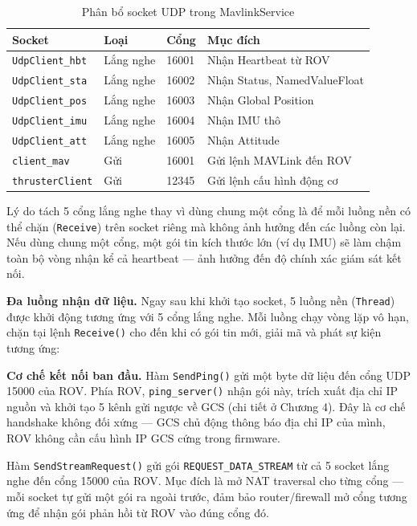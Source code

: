 \documentclass[../DoAn.tex]{subfiles}
\begin{document}
\begin{table}[H]
\centering
\renewcommand{\arraystretch}{1.3}
\begin{tabular}{|l|l|l|p{5cm}|}
\hline
\textbf{Socket} & \textbf{Loại} & \textbf{Cổng} & \textbf{Mục đích} \\
\hline
\texttt{UdpClient\_hbt} & Lắng nghe & 16001 & Nhận Heartbeat từ ROV \\
\hline
\texttt{UdpClient\_sta} & Lắng nghe & 16002 & Nhận Status, NamedValueFloat \\
\hline
\texttt{UdpClient\_pos} & Lắng nghe & 16003 & Nhận Global Position \\
\hline
\texttt{UdpClient\_imu} & Lắng nghe & 16004 & Nhận IMU thô \\
\hline
\texttt{UdpClient\_att} & Lắng nghe & 16005 & Nhận Attitude \\
\hline
\texttt{client\_mav}    & Gửi       & 16001 & Gửi lệnh MAVLink đến ROV \\
\hline
\texttt{thrusterClient} & Gửi       & 12345 & Gửi lệnh cấu hình động cơ \\
\hline
\end{tabular}
\caption{Phân bổ socket UDP trong MavlinkService}
\label{tab:mavlink_sockets}
\end{table}

Lý do tách 5 cổng lắng nghe thay vì dùng chung một cổng là để mỗi
luồng nền có thể chặn (\texttt{Receive}) trên socket riêng mà không
ảnh hưởng đến các luồng còn lại. Nếu dùng chung một cổng, một gói
tin kích thước lớn (ví dụ IMU) sẽ làm chậm toàn bộ vòng nhận kể cả
heartbeat --- ảnh hưởng đến độ chính xác giám sát kết nối.

\textbf{Đa luồng nhận dữ liệu.}
Ngay sau khi khởi tạo socket, 5 luồng nền (\texttt{Thread}) được khởi
động tương ứng với 5 cổng lắng nghe. Mỗi luồng chạy vòng lặp vô hạn,
chặn tại lệnh \texttt{Receive()} cho đến khi có gói tin mới, giải mã
và phát sự kiện tương ứng:


\textbf{Cơ chế kết nối ban đầu.}
Hàm \texttt{SendPing()} gửi một byte dữ liệu đến cổng UDP 15000 của
ROV. Phía ROV, \texttt{ping\_server()} nhận gói này, trích xuất địa
chỉ IP nguồn và khởi tạo 5 kênh gửi ngược về GCS (chi tiết ở Chương
4). Đây là cơ chế handshake không đối xứng --- GCS chủ động thông báo
địa chỉ IP của mình, ROV không cần cấu hình IP GCS cứng trong firmware.

Hàm \texttt{SendStreamRequest()} gửi gói \texttt{REQUEST\_DATA\_STREAM}
từ cả 5 socket lắng nghe đến cổng 15000 của ROV. Mục đích là mở NAT
traversal cho từng cổng --- mỗi socket tự gửi một gói ra ngoài trước,
đảm bảo router/firewall mở cổng tương ứng để nhận gói phản hồi từ ROV
vào đúng cổng đó.
\end{document}
